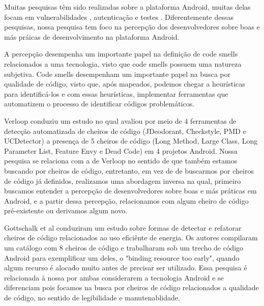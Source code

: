 Muitas pesquisas t\^em sido realizadas sobre a plataforma Android, muitas delas focam em vulnerabilidades \cite{Y, F, G, X, P, D, E}, autentica\c{c}\~ao \cite{T, Yamashita6405287, R} e testes \cite{J, M}. Diferentemente dessas pesquisas, nossa pesquisa tem foco na percep\c{c}\~ao dos desenvolvedores sobre boas e m\'as pr\'aicas de desenvolvimento na plataforma Android. 

A percep\c{c}\~ao desempenha um importante papel na defini\c{c}\~ao de code smells relacionados a uma tecnologia, visto que code smells possuem uma natureza subjetiva. Code smells desempenham um importante papel na busca por qualidade de c\'odigo, visto que, ap\'os mapeados, podemos chegar a heur\'isticas para identific\'a-los e com essas heur\'isticas, implementar ferramentas que automatizem o processo de identificar c\'odigos problem\'aticos.

Verloop \cite{MobileSmells:13} conduziu um estudo no qual avaliou por meio de 4 ferramentas de detec\c{c}\~ao automatizada de cheiros de c\'odigo (JDeodorant, Checkstyle, PMD e UCDetector) a presen\c{c}a de 5 cheiros de c\'odigo (Long Method, Large Class, Long Parameter List, Feature Envy e Dead Code) em 4 projetos Android. Nossa pesquisa se relaciona com a de Verloop no sentido de que tamb\'em estamos buscando por cheiros de c\'odigo, entretanto, em vez de de buscarmos por cheiros de c\'odigo j\'a definidos, realizamos uma abordagem inversa na qual, primeiro buscamos entender a percep\c{c}\~ao de desenvolvedores sobre boas e m\'as pr\'aticas em Android, e a partir dessa percep\c{c}\~ao, relacionamos com algum cheiro de c\'odigo pr\'e-existente ou derivamos algum novo.

Gottschalk et al \cite{EnergyAndroidSmells} conduziram um estudo sobre formas de detectar e refatorar cheiros de c\'odigo relacionados ao uso efici\^ente de energia. Os autores compilaram um cat\'alogo com 8 cheiros de c\'odigo e trabalharam sob um trecho de c\'odigo Android para exemplificar um deles, o "binding resource too early", quando algum recurso \'e alocado muito antes de precisar ser utilizado. Essa pesquisa \'e relacionada \`a nossa por ambas considerarem a tecnologia Android e se diferenciam pois focamos na busca por cheiros de c\'odigo relacionados a qualidade de c\'odigo, no sentido de legibilidade e manutenablidade.

